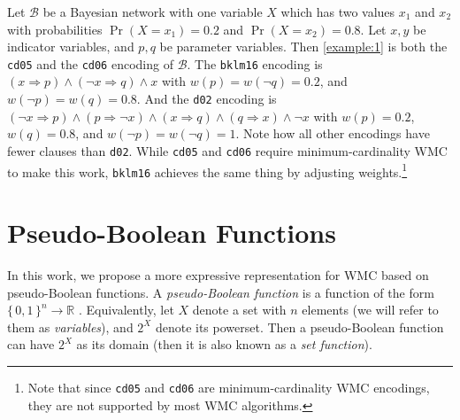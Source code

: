 \begin{example} \label{example:2}
  Let $\mathcal{B}$ be a Bayesian network with one variable $X$ which has two
  values $x_1$ and $x_2$ with probabilities $\Pr(X = x_1) = 0.2$ and $\Pr(X =
  x_2) = 0.8$. Let $x, y$ be indicator variables, and $p, q$ be parameter
  variables. Then \cref{example:1} is both the \texttt{cd05} and the
  \texttt{cd06} encoding of $\mathcal{B}$. The \texttt{bklm16} encoding is $(x
  \Rightarrow p) \land (\neg x \Rightarrow q) \land x$ with $w(p) = w(\neg q) =
  0.2$, and $w(\neg p) = w(q) = 0.8$. And the \texttt{d02} encoding is $(\neg x
  \Rightarrow p) \land (p \Rightarrow \neg x) \land (x \Rightarrow q) \land (q
  \Rightarrow x) \land \neg x$ with $w(p) = 0.2$, $w(q) = 0.8$, and $w(\neg p) =
  w(\neg q) = 1$. Note how all other encodings have fewer clauses than
  \texttt{d02}. While \texttt{cd05} and \texttt{cd06} require
  minimum-cardinality WMC to make this work, \texttt{bklm16} achieves the same
  thing by adjusting weights.\footnote{Note that since \texttt{cd05} and
    \texttt{cd06} are minimum-cardinality WMC encodings, they are not supported
    by most WMC algorithms.}
\end{example}


\section{Pseudo-Boolean Functions}

In this work, we propose a more expressive representation for WMC based on
pseudo-Boolean functions. A \emph{pseudo-Boolean function} is a function of the
form ${\{\, 0, 1 \,\}}^n \to \mathbb{R}$ \citep{DBLP:journals/dam/BorosH02}.
Equivalently, let $X$ denote a set with $n$ elements (we will refer to them as
\emph{variables}), and $2^X$ denote its powerset. Then a pseudo-Boolean function
can have $2^X$ as its domain (then it is also known as a \emph{set function}).

